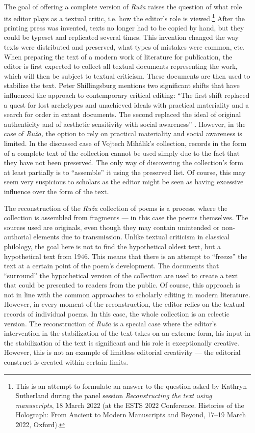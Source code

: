\documentclass{article}
\begin{document}
The goal of offering a complete version of \emph{Ruža} raises the
question of what role its editor plays as a textual critic, i.e. how the
editor's role is viewed.\footnote{This is an attempt to formulate an
  answer to the question asked by Kathryn Sutherland during the panel
  session \emph{Reconstructing the text using manuscripts}, 18 March
  2022 (at the ESTS 2022 Conference. Histories of the Holograph: From
  Ancient to Modern Manuscripts and Beyond, 17--19 March 2022, Oxford).}
After the printing press was invented, texts no longer had to be copied
by hand, but they could be typeset and replicated several times. This
invention changed the way texts were distributed and preserved, what
types of mistakes were common, etc. When preparing the text of a modern
work of literature for publication, the editor is first expected to
collect all textual documents representing the work, which will then be
subject to textual criticism. These documents are then used to stabilize
the text. Peter Shillingsburg mentions two significant shifts that have
influenced the approach to contemporary critical editing: ``The first
shift replaced a quest for lost archetypes and unachieved ideals with
practical materiality and a search for order in extant documents. The
second replaced the ideal of original authenticity and of aesthetic
sensitivity with social awareness'' \citep[167]{shillingsburg_how_2010}. However,
in the case of \emph{Ruža,} the option to rely on practical materiality
and social awareness is limited. In the discussed case of Vojtech
Mihálik's collection, records in the form of a complete text of the
collection cannot be used simply due to the fact that they have not been
preserved. The only way of discovering the collection's form at least
partially is to ``assemble'' it using the preserved list. Of course,
this may seem very suspicious to scholars as the editor might be seen as
having excessive influence over the form of the text.

The reconstruction of the \emph{Ruža} collection of poems is a process,
where the collection is assembled from fragments –– in this case the
poems themselves. The sources used are originals, even though they may
contain unintended or non-authorial elements due to transmission. Unlike
textual criticism in classical philology, the goal here is not to find
the hypothetical oldest text, but a hypothetical text from 1946. This
means that there is an attempt to ``freeze'' the text at a certain point
of the poem's development. The documents that ``surround'' the
hypothetical version of the collection are used to create a text that
could be presented to readers from the public. Of course, this approach
is not in line with the common approaches to scholarly editing in modern
literature. However, in every moment of the reconstruction, the editor
relies on the textual records of individual poems. In this case, the
whole collection is an eclectic version. The reconstruction of
\emph{Ruža} is a special case where the editor's intervention in the
stabilization of the text takes on an extreme form, his input in the
stabilization of the text is significant and his role is exceptionally
creative. However, this is not an example of limitless editorial
creativity –– the editorial construct is created within certain limits.
\end{document}
